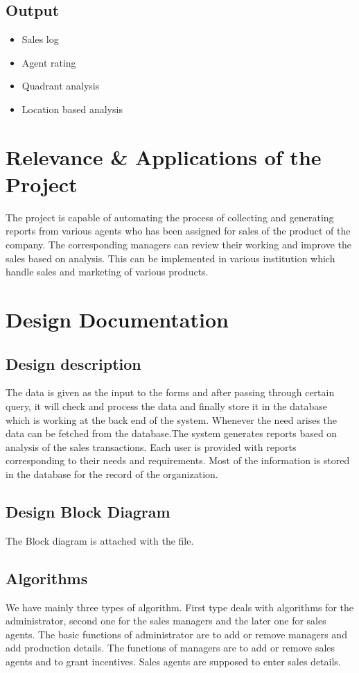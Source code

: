 \documentclass[twocolumn,10pt]{article}
\begin{document}
\subsection{Output}
\begin{itemize}
   \item Sales log
   \item Agent rating
   \item Quadrant analysis
   \item Location based analysis
\end{itemize}
\section{Relevance \& Applications of the Project}
The project is capable of automating the process of collecting and generating reports from various agents who has been assigned for sales of the product of the company. The corresponding managers can review their working and improve the sales based on analysis. This can be implemented in various institution which handle sales and marketing of various products.
\section{Design Documentation}
\subsection{Design description}
The data is given as the input to the forms and after passing through certain query, it will check and process the data and finally store it in the database which is working at the back end of the system. Whenever the need arises the data can be fetched from the database.The system generates reports based on analysis of the sales transactions. Each user is provided with reports corresponding to their needs and requirements. Most of the information is stored in the database for the record of the organization.
\subsection{Design Block Diagram}
The Block diagram is attached with the file.
\subsection{Algorithms}
We have mainly three types of algorithm. First type deals with algorithms for the administrator, second one for the sales managers and the later one for sales agents. The basic functions of administrator are to add or remove managers and add production details. The functions of managers are to add or remove sales agents and to grant incentives. Sales agents are supposed to enter sales details. 
\end{document}

